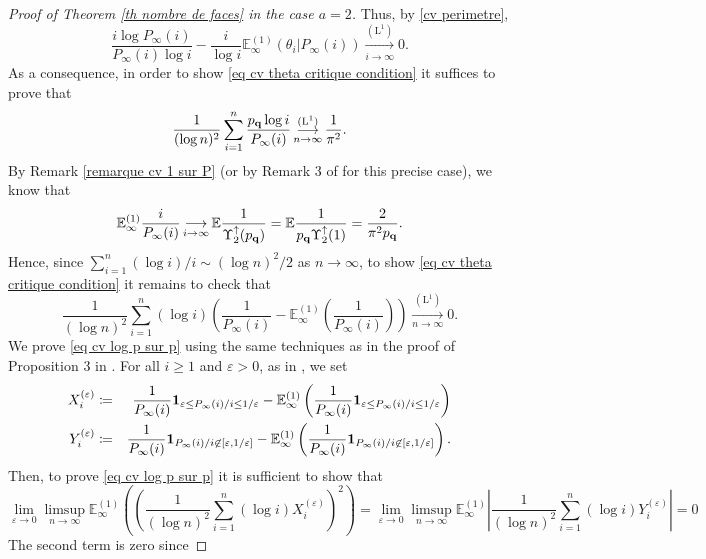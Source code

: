 \documentclass[11pt]{article}
\numberwithin{equation}{section}
\def\vp{\varepsilon}
\def\E{\mathbb{E}}
\begin{document}
\begin{proof}[Proof of Theorem \ref{th nombre de faces} in the case $a=2$]
Thus, by \eqref{cv perimetre},
$$
\frac{i \log P_\infty(i)}{P_\infty(i) \log i}-
\frac{i}{\log i}\E^{(1)}_\infty(\theta_i \vert P_\infty(i))
\mathop{\longrightarrow}\limits_{i \to \infty}^{(\mathrm{L}^1)}
0
.
$$
As a consequence, in order to show \eqref{eq cv theta critique condition} it suffices to prove that
$$
\frac{1}{(\log n)^2}\sum_{i=1}^n \frac{p_{\bf q} \log i}{P_\infty(i)}
\mathop{\longrightarrow}\limits_{n\to \infty}^{(\mathrm{L}^1)}
\frac{1}{\pi^2}.
$$
By Remark \ref{remarque cv 1 sur P} (or by Remark 3 of \cite{BCM} for this precise case), we know that
\begin{equation}\label{eq cv un sur P critique}
\E_\infty^{(1)} \frac{i}{P_\infty(i)}
\mathop{\longrightarrow}\limits_{i\to \infty}
\E \frac{1}{\Upsilon^\uparrow_2(p_{\bf q})}
= \E \frac{1}{p_{\bf q} \Upsilon^\uparrow_2(1)}
=\frac{2}{\pi^2 p_{\bf q}}.
\end{equation}
Hence, since $\sum_{i=1}^n (\log i)/i \sim (\log n )^2/2$ as $n \to \infty$, to show \eqref{eq cv theta critique condition} it remains to check that
\begin{equation}\label{eq cv log p sur p}
\frac{1}{(\log n)^2}\sum_{i=1}^n (\log i)\left( \frac{1}{P_\infty(i)}
-\E^{(1)}_\infty \left(\frac{1}{P_\infty(i)}\right)
\right)
\mathop{\longrightarrow}\limits_{n\to \infty}^{(\mathrm{L}^1)}
0.
\end{equation}
We prove \eqref{eq cv log p sur p} using the same techniques as in the proof of Proposition 3 in \cite{BCM}. For all $i\ge 1$ and $\vp>0$, as in \cite{BCM}, we set
\begin{eqnarray*}
X_i^{(\vp)} &\coloneqq &
\frac{1}{P_\infty(i)}{\bf 1}_{\vp \le P_\infty(i)/i \le 1/\vp}- \E^{(1)}_\infty \left( \frac{1}{P_\infty(i)}{\bf 1}_{\vp \le P_\infty(i)/i \le 1/\vp} \right)
\\
Y_i^{(\vp)} &\coloneqq &
\frac{1}{P_\infty(i)}{\bf 1}_{P_\infty(i)/i \not\in [\vp, 1/\vp]}- \E^{(1)}_\infty \left(\frac{1}{P_\infty(i)}{\bf 1}_{P_\infty(i)/i \not\in [\vp, 1/\vp]}\right).
\end{eqnarray*}
Then, to prove \eqref{eq cv log p sur p} it is sufficient to show that
\begin{equation}\label{eq cv X Y epsilon}
\lim_{\vp \to 0}\limsup_{n\to \infty}\E^{(1)}_\infty\left(
\left(
\frac{1}{(\log n)^2}\sum_{i=1}^n (\log i)X^{(\vp)}_i
\right)^2
\right)
=\lim_{\vp \to 0} \limsup_{n\to \infty}
\E^{(1)}_\infty
\left\vert
\frac{1}{(\log n)^2}\sum_{i=1}^n (\log i)Y^{(\vp)}_i
\right\vert
=0
\end{equation}
The second term is zero since

\end{proof}
\end{document}
